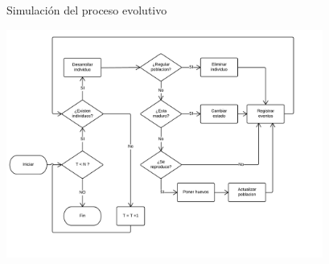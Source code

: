 \begin{frame}[c]{Simulación del proceso evolutivo}
  \begin{center}
    \includegraphics[height=7.5cm]{./graphics/algoritmo-propuesto.png}
  \end{center}
\end{frame}


